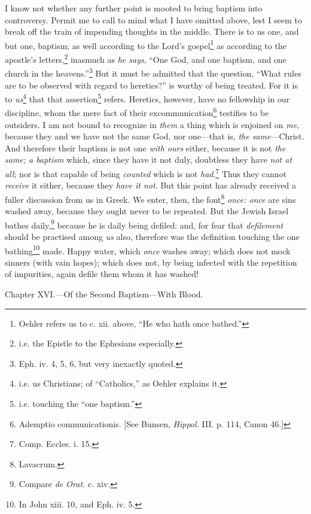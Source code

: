 I know not whether any further point is mooted to bring baptism into controversy. Permit me to call to mind what I have omitted above, lest I seem to break off the train of impending thoughts in the middle. There is to us one, and but one, baptism; as well according to the Lord’s gospel\footnote{Oehler refers us to c. xii. above, “He who hath once bathed.”} as according to the apostle’s letters,\footnote{i.e. the Epistle to the Ephesians especially.} inasmuch as \emph{he says}, “One God, and one baptism, and one church in the heavens.”\footnote{Eph. iv. 4, 5, 6, but very inexactly quoted.} But it must be admitted that the question, “What rules are to be observed with regard to heretics?” is worthy of being treated. For it is to \emph{us}\footnote{i.e. us Christians; of “Catholics,” as Oehler explains it.} that that assertion\footnote{i.e. touching the “one baptism.”} refers. Heretics, however, have no fellowship in our discipline, whom the mere fact of their excommunication\footnote{Ademptio communicationis. [See Bunsen, \emph{Hippol.} III. p. 114, Canon 46.]} testifies to be outsiders. I am not bound to recognize in \emph{them} a thing which is enjoined on \emph{me}, because they and we have not the same God, nor one—that is, \emph{the same}—Christ. And therefore their baptism is not one \emph{with ours} either, because it is not \emph{the same; a baptism} which, since they have it not duly, doubtless they have \emph{not at all}; nor is that capable of being \emph{counted} which is not \emph{had}.\footnote{Comp. Eccles. i. 15.} Thus they cannot \emph{receive} it either, because they \emph{have it not}. But this point has already received a fuller discussion from us in Greek. We enter, then, the font\footnote{Lavacrum.} \emph{once: once} are sins washed away, because they ought never to be repeated. But the Jewish Israel bathes daily,\footnote{Compare \emph{de Orat.} c. xiv.} because he is daily being defiled: and, for fear that \emph{defilement} should be practised among \emph{us} also, therefore was the definition touching the one bathing\footnote{In John xiii. 10, and Eph. iv. 5.} made. Happy water, which \emph{once} washes away; which does not mock sinners (with vain hopes); which does not, by being infected with the repetition of impurities, again defile them whom it has washed!


Chapter XVI.—Of the Second Baptism—With Blood.

